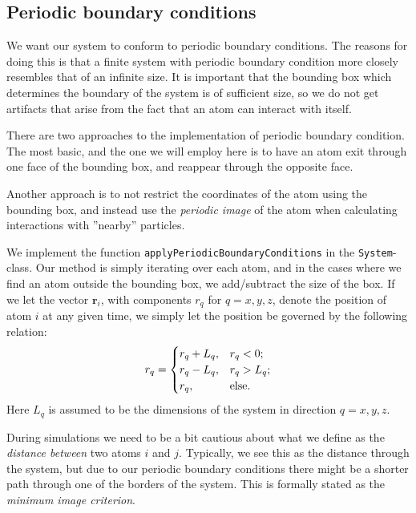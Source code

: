 \documentclass[a4paper]{article}
\renewcommand{\vec}[1]{\mathbf{#1}}
\begin{document}
\subsection{Periodic boundary conditions}
\label{sub:periodic_boundary_conditions}
        
    We want our system to conform to periodic boundary conditions. The reasons
    for doing this is that a finite system with periodic boundary condition
    more closely resembles that of an infinite size. It is important that the
    bounding box which determines the boundary of the system is of sufficient
    size, so we do not get artifacts that arise from the fact that an atom can
    interact with itself. 
    
    There are two approaches to the implementation of periodic boundary
    condition. The most basic, and the one we will employ here is to have an
    atom exit through one face of the bounding box, and reappear through the
    opposite face. 

    Another approach is to not restrict the coordinates of the atom using the
    bounding box, and instead use the \emph{periodic image} of the atom when
    calculating interactions with ''nearby'' particles.
    
    We implement the function \texttt{applyPeriodicBoundaryConditions} in the
    \texttt{System}-class.  Our method is simply iterating over each atom, and
    in the cases where we find an atom outside the bounding box, we
    add/subtract the size of the box. If we let the vector $\vec{r}_i$, with
    components $r_q$ for $q = x, y, z$, denote the position of atom $i$ at any
    given time, we simply let the position be governed by the following
    relation:
    \begin{equation}
        \notag
        r_q = \begin{cases}
            r_q + L_q, & r_q < 0; \\
            r_q - L_q, & r_q > L_q; \\
            r_q, & \text{else.}
        \end{cases}
    \end{equation}
    Here $L_q$ is assumed to be the dimensions of the system in direction $q =
    x, y, z$.
    
    During simulations we need to be a bit cautious about what we define as the
    \emph{distance between} two atoms $i$ and $j$. Typically, we see this as
    the distance through the system, but due to our periodic boundary
    conditions there might be a shorter path through one of the borders of the
    system. This is formally stated as the \emph{minimum image
    criterion}\cite{min_image}.
    
\end{document}

